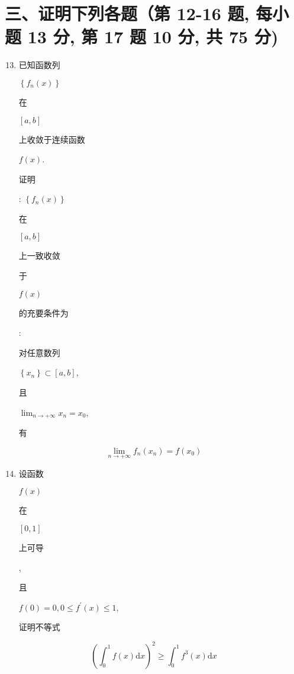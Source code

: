 \documentclass[10pt]{article}
\begin{document}
\section{三、证明下列各题（第 12-16 题, 每小题 13 分, 第 17 题 10 分, 共 75 分)}
\begin{enumerate}
  \setcounter{enumi}{12}
  \item \begin{CJK}{UTF8}{mj}已知函数列\end{CJK} $\left\{f_{n}(x)\right\}$ \begin{CJK}{UTF8}{mj}在\end{CJK} $[a, b]$ \begin{CJK}{UTF8}{mj}上收敛于连续函数\end{CJK} $f(x)$. \begin{CJK}{UTF8}{mj}证明\end{CJK}: $\left\{f_{n}(x)\right\}$ \begin{CJK}{UTF8}{mj}在\end{CJK} $[a, b]$ \begin{CJK}{UTF8}{mj}上一致收敛\end{CJK} \begin{CJK}{UTF8}{mj}于\end{CJK} $f(x)$ \begin{CJK}{UTF8}{mj}的充要条件为\end{CJK}: \begin{CJK}{UTF8}{mj}对任意数列\end{CJK} $\left\{x_{n}\right\} \subset[a, b]$, \begin{CJK}{UTF8}{mj}且\end{CJK} $\lim _{n \rightarrow+\infty} x_{n}=x_{0}$, \begin{CJK}{UTF8}{mj}有\end{CJK}
\end{enumerate}
$$
\lim _{n \rightarrow+\infty} f_{n}\left(x_{n}\right)=f\left(x_{0}\right)
$$

\begin{enumerate}
  \setcounter{enumi}{13}
  \item \begin{CJK}{UTF8}{mj}设函数\end{CJK} $f(x)$ \begin{CJK}{UTF8}{mj}在\end{CJK} $[0,1]$ \begin{CJK}{UTF8}{mj}上可导\end{CJK}, \begin{CJK}{UTF8}{mj}且\end{CJK} $f(0)=0,0 \leqslant f^{\prime}(x) \leqslant 1$, \begin{CJK}{UTF8}{mj}证明不等式\end{CJK}
\end{enumerate}
$$
\left(\int_{0}^{1} f(x) \mathrm{d} x\right)^{2} \geq \int_{0}^{1} f^{3}(x) \mathrm{d} x
$$
\end{document}

